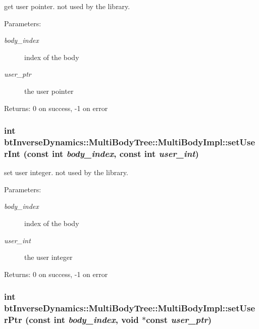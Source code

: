 get user pointer. not used by the library. \begin{Desc}
\item[Parameters:]
\begin{description}
\item[{\em body\_\-index}]index of the body \item[{\em user\_\-ptr}]the user pointer \end{description}
\end{Desc}
\begin{Desc}
\item[Returns:]0 on success, -1 on error \end{Desc}
 \hypertarget{classbt_inverse_dynamics_1_1_multi_body_tree_1_1_multi_body_impl_975f98e25ccfc364e3e5b6f49bdce2f2}{
\subsubsection[setUserInt]{\setlength{\rightskip}{0pt plus 5cm}int btInverseDynamics::MultiBodyTree::MultiBodyImpl::setUserInt (const int {\em body\_\-index}, \/  const int {\em user\_\-int})}}
\label{classbt_inverse_dynamics_1_1_multi_body_tree_1_1_multi_body_impl_975f98e25ccfc364e3e5b6f49bdce2f2}


set user integer. not used by the library. \begin{Desc}
\item[Parameters:]
\begin{description}
\item[{\em body\_\-index}]index of the body \item[{\em user\_\-int}]the user integer \end{description}
\end{Desc}
\begin{Desc}
\item[Returns:]0 on success, -1 on error \end{Desc}
 \hypertarget{classbt_inverse_dynamics_1_1_multi_body_tree_1_1_multi_body_impl_e3d149282a6c90ea6b0bcfe9c25066be}{
\subsubsection[setUserPtr]{\setlength{\rightskip}{0pt plus 5cm}int btInverseDynamics::MultiBodyTree::MultiBodyImpl::setUserPtr (const int {\em body\_\-index}, \/  void $\ast$const  {\em user\_\-ptr})}}
\label{classbt_inverse_dynamics_1_1_multi_body_tree_1_1_multi_body_impl_e3d149282a6c90ea6b0bcfe9c25066be}


